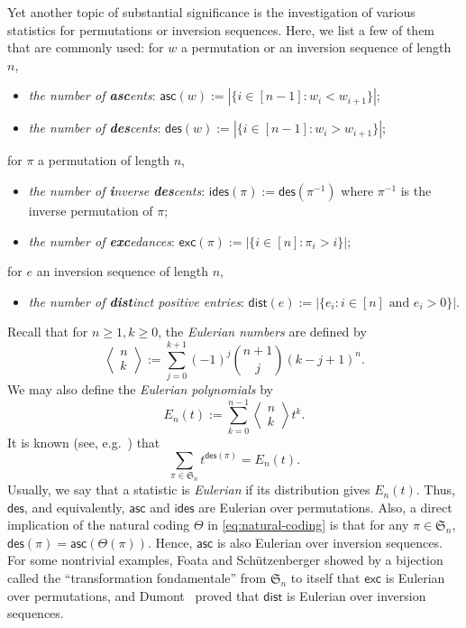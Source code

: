\documentclass[reqno]{amsart}
\numberwithin{equation}{section}
\theoremstyle{plain}
\theoremstyle{definition}
\theoremstyle{named}
\newcommand{\fS}{\mathfrak{S}}
\newcommand{\asc}{\mathsf{asc}}
\newcommand{\des}{\mathsf{des}}
\newcommand{\ides}{\mathsf{ides}}
\newcommand{\exc}{\mathsf{exc}}
\newcommand{\dist}{\mathsf{dist}}
\begin{document}
Yet another topic of substantial significance is the investigation of various statistics for permutations or inversion sequences. Here, we list a few of them that are commonly used: for $w$ a permutation or an inversion sequence of length $n$,
\begin{itemize}[leftmargin=*,align=left]
	\renewcommand{\labelitemi}{$\triangleright$}
	\item \textit{the number of \textbf{asc}ents}: $\asc(w):=|\{i\in[n-1]:w_i<w_{i+1}\}|$;
	
	\item \textit{the number of \textbf{des}cents}: $\des(w):=|\{i\in[n-1]:w_i>w_{i+1}\}|$;
\end{itemize}
for $\pi$ a permutation of length $n$,
\begin{itemize}[leftmargin=*,align=left]
	\renewcommand{\labelitemi}{$\triangleright$}
	\item \textit{the number of \textbf{i}nverse \textbf{des}cents}: $\ides(\pi):=\des(\pi^{-1})$ where $\pi^{-1}$ is the inverse permutation of $\pi$;
	
	\item \textit{the number of \textbf{exc}edances}: $\exc(\pi):=|\{i\in[n]:\pi_i>i\}|$; 
\end{itemize}
for $e$ an inversion sequence of length $n$,
\begin{itemize}[leftmargin=*,align=left]
	\renewcommand{\labelitemi}{$\triangleright$}
	\item \textit{the number of \textbf{dist}inct positive entries}: $\dist(e):=|\{e_i:\text{$i\in[n]$ and $e_i>0$}\}|$.
\end{itemize}

Recall that for $n\ge 1, k\ge 0$, the \textit{Eulerian numbers} are defined by
$$\left \langle \begin{matrix}
	n\\k
\end{matrix} \right \rangle :=\sum_{j=0}^{k+1} (-1)^j \binom{n+1}{j} (k-j+1)^n.$$
We may also define the \textit{Eulerian polynomials} by
$$E_n(t):=\sum_{k=0}^{n-1}\left \langle \begin{matrix}
	n\\k
\end{matrix} \right \rangle t^k.$$
It is known (see, e.g.~\cite[Sect.~1.4]{Per2015}) that
$$\sum_{\pi\in\fS_n}t^{\des(\pi)} = E_n(t).$$
Usually, we say that a statistic is \textit{Eulerian} if its distribution gives $E_n(t)$. Thus, $\des$, and equivalently, $\asc$ and $\ides$ are Eulerian over permutations. Also, a direct implication of the natural coding $\Theta$ in \eqref{eq:natural-coding} is that for any $\pi\in\fS_n$, $\des(\pi)=\asc(\Theta(\pi))$. Hence, $\asc$ is also Eulerian over inversion sequences. For some nontrivial examples, Foata and Sch\"utzenberger \cite{FS1970} showed by a bijection called the ``transformation fondamentale'' from $\fS_n$ to itself that $\exc$ is Eulerian over permutations, and Dumont~\cite{Dum1974} proved that $\dist$ is Eulerian over inversion sequences.
\end{document}
